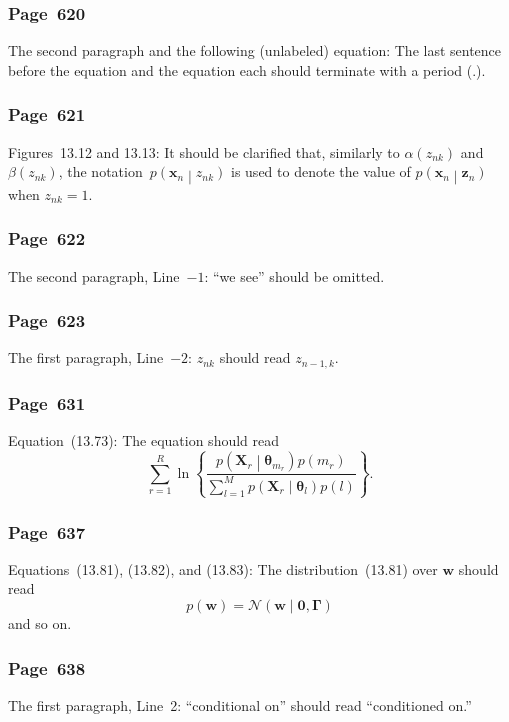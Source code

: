 \documentclass[12pt,a4paper]{article}
\newcommand{\erratum}[1]{\subsubsection*{#1}}
\begin{document}
\erratum{Page~620}
The second paragraph and the following (unlabeled) equation:
The last sentence before the equation and the equation each should terminate with a period (.).

\erratum{Page~621}
Figures~13.12 and 13.13:
It should be clarified that, similarly to $\alpha(z_{nk})$ and $\beta(z_{nk})$,
the notation~$p\left(\mathbf{x}_n \middle| z_{nk}\right)$ is used to denote
the value of $p\left(\mathbf{x}_n \middle| \mathbf{z}_{n}\right)$ when $z_{nk} = 1$.

\erratum{Page~622}
The second paragraph, Line~$-1$:
``we see'' should be omitted.

\erratum{Page~623}
The first paragraph, Line~$-2$:
$z_{nk}$ should read $z_{n - 1, k}$.

\erratum{Page~631}
Equation~(13.73):
The equation should read
\begin{equation}
\sum_{r=1}^{R} \ln \left\{
  \frac{p\left(\mathbf{X}_{r}\middle|\bm{\theta}_{m_r}\right)p(m_r)}{
    \sum_{l=1}^{M}p\left(\mathbf{X}_{r}\middle|\bm{\theta}_{l}\right)p(l)} \right\} .
\end{equation}

\erratum{Page~637}
Equations~(13.81), (13.82), and (13.83):
The distribution~(13.81) over $\mathbf{w}$ should read
\begin{equation}
p(\mathbf{w}) = \mathcal{N}\left(\mathbf{w}\middle|\mathbf{0}, \bm{\Gamma}\right)
\end{equation}
and so on.

\erratum{Page~638}
The first paragraph, Line~2:
``conditional on'' should read ``conditioned on.''
\end{document}
